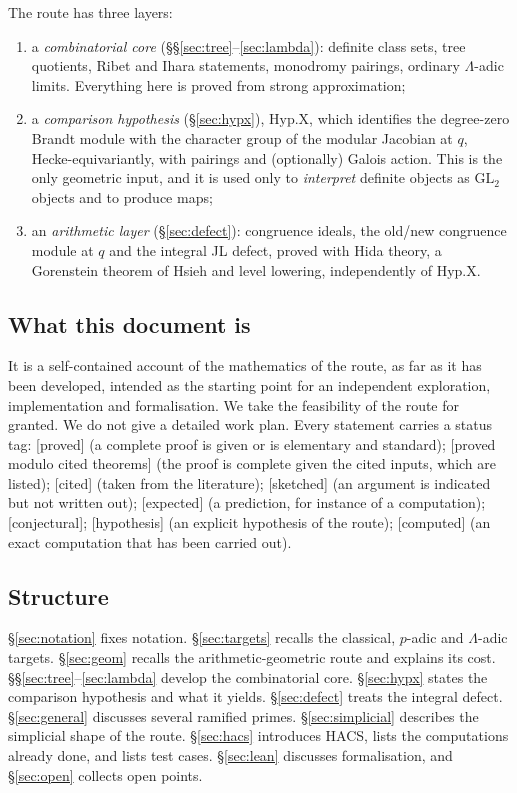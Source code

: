 \documentclass[11pt]{amsart}
\theoremstyle{plain}
\theoremstyle{definition}
\theoremstyle{remark}
\newcommand{\status}[1]{\textup{\textsf{[#1]}}}
\newcommand{\stproved}{\status{proved}}
\newcommand{\stpmc}{\status{proved modulo cited theorems}}
\newcommand{\stcited}{\status{cited}}
\newcommand{\stsketch}{\status{sketched}}
\newcommand{\stexp}{\status{expected}}
\newcommand{\stconj}{\status{conjectural}}
\newcommand{\sthyp}{\status{hypothesis}}
\newcommand{\stcomp}{\status{computed}}
\newcommand{\GL}{\mathrm{GL}}\newcommand{\SL}{\mathrm{SL}}\newcommand{\PGL}{\mathrm{PGL}}
\begin{document}
The route has three layers:
\begin{enumerate}[label=(\alph*)]
\item a \emph{combinatorial core} (\S\S\ref{sec:tree}--\ref{sec:lambda}): definite class sets, tree quotients, Ribet and Ihara statements, monodromy pairings, ordinary $\Lambda$-adic limits. Everything here is proved from strong approximation;
\item a \emph{comparison hypothesis} (\S\ref{sec:hypx}), $\mathrm{Hyp.X}$, which identifies the degree-zero Brandt module with the character group of the modular Jacobian at $q$, Hecke-equivariantly, with pairings and (optionally) Galois action. This is the only geometric input, and it is used only to \emph{interpret} definite objects as $\GL_2$ objects and to produce maps;
\item an \emph{arithmetic layer} (\S\ref{sec:defect}): congruence ideals, the old/new congruence module at $q$ and the integral JL defect, proved with Hida theory, a Gorenstein theorem of Hsieh and level lowering, independently of $\mathrm{Hyp.X}$.
\end{enumerate}

\subsection{What this document is}
It is a self-contained account of the mathematics of the route, as far as it has been developed, intended as the starting point for an independent exploration, implementation and formalisation.
We take the feasibility of the route for granted. We do not give a detailed work plan.
Every statement carries a status tag:
\stproved{} (a complete proof is given or is elementary and standard);
\stpmc{} (the proof is complete given the cited inputs, which are listed);
\stcited{} (taken from the literature);
\stsketch{} (an argument is indicated but not written out);
\stexp{} (a prediction, for instance of a computation);
\stconj{};
\sthyp{} (an explicit hypothesis of the route);
\stcomp{} (an exact computation that has been carried out).

\subsection{Structure}
\S\ref{sec:notation} fixes notation. \S\ref{sec:targets} recalls the classical, $p$-adic and $\Lambda$-adic targets.
\S\ref{sec:geom} recalls the arithmetic-geometric route and explains its cost.
\S\S\ref{sec:tree}--\ref{sec:lambda} develop the combinatorial core.
\S\ref{sec:hypx} states the comparison hypothesis and what it yields.
\S\ref{sec:defect} treats the integral defect.
\S\ref{sec:general} discusses several ramified primes.
\S\ref{sec:simplicial} describes the simplicial shape of the route.
\S\ref{sec:hacs} introduces HACS, lists the computations already done, and lists test cases.
\S\ref{sec:lean} discusses formalisation, and \S\ref{sec:open} collects open points.
\end{document}

